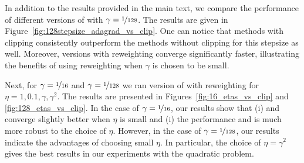 \documentclass{article}
\begin{document}




In addition to the results provided in the main text, we compare the performance of different versions of  with $\gamma = \nicefrac{1}{128}$. The results are given in Figure~\ref{fig:128stepsize_adagrad_vs_clip}. One can notice that methods with clipping consistently outperform the methods without clipping for this stepsize as well. Moreover, versions with reweighting converge significantly faster, illustrating the benefits of using reweighting when $\gamma$ is chosen to be small.

Next, for $\gamma = \nicefrac{1}{16}$ and $\gamma = \nicefrac{1}{128}$ we ran version of  with reweighting for $\eta = 1, 0.1, \gamma, \gamma^2$. The results are presented in Figures~\ref{fig:16_etas_vs_clip} and \ref{fig:128_etas_vs_clip}. In the case of $\gamma = \nicefrac{1}{16}$, our results show that (i)  and  converge slightly better when $\eta$ is small and (i) the performance  and  is much more robust to the choice of $\eta$. However, in the case of $\gamma = \nicefrac{1}{128}$, our results indicate the advantages of choosing small $\eta$. In particular, the choice of $\eta = \gamma^2$ gives the best results in our experiments with the quadratic problem.


\end{document}
